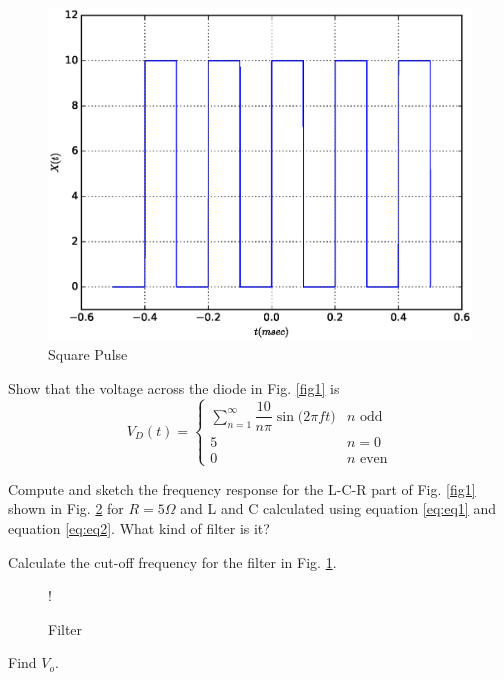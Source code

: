 \documentclass[journal,12pt,twocolumn]{IEEEtran}
\begin{document}
\begin{figure}[h]
	\includegraphics[scale=0.5]{./figs/square.eps}
	\caption{Square Pulse} \label{fig6}
    \end{figure}
\begin{problem}
Show that the voltage across the diode in Fig. \ref{fig1} is
%
\begin{equation}
V_D(t) =
\begin{cases}
  \sum_{n=1}^{\infty} \dfrac{10}{n \pi} \sin \Big (2\pi ft \Big ) & n \text{ odd}
 \\
 5   & n = 0
 \\
 0 & n \text{ even}
 \end{cases}
\end{equation}

\end{problem}
\begin{problem}
Compute  and sketch the frequency response for the L-C-R part of Fig. \ref{fig1} shown in Fig. \ref{fig7} for $R = 5 \Omega$ and L and C calculated using  equation \eqref{eq:eq1} and  equation \eqref{eq:eq2}. What kind of filter is it?
\end{problem}
\begin{problem}
Calculate the cut-off frequency for the filter in Fig. \ref{fig6}.  
\label{prob}
\end{problem}
\begin{figure}
       \centering  
       \resizebox {\columnwidth} {!} {

}
    \caption{Filter} \label{fig7}
   \end{figure}
   \begin{problem}
   Find $V_{o}$. 
   \end{problem}
 
\end{document}
